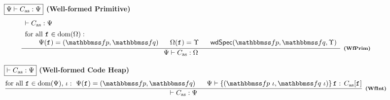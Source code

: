 \begin{figure*}[!t]
    \centering
    \subfigure
    {
        \begin{minipage}{1\linewidth}
            $\boxed{{\Psi} \vdash {C_{\text{as}}} : {\Psi}}$ \quad\quad
            \textbf{(Well-formed Primitive)}
            \[
				\infer[\tinybftext{(WfPrim)}]
				{
					\wfprim{\Cspec}{\asmimp}{\hprimset}
				}
				{
                    \begin{array}{l}
                        \wfcdhp{\asmimp}{\Cspec} \\
                        \\[-8pt]
                        \TYPE{for all } \lab{} \in \dom(\hprimset): \\
                        \qquad
                        \Cspec(\lab{}) = (\relspecpre, \relspecpost)
                        \quad \ \
                        \hprimset(\lab{}) = \hprim \quad \ \
                        \wdSpec{\relspecpre}{\relspecpost}
                        	{\hprim}
                    \end{array}
				}
			\]
		\end{minipage}
    }

    \subfigure
    {
        \begin{minipage}{1\textwidth}
            $\boxed{\vdash {C_{\text{as}}} : {\Psi}}$ \qquad
            \textbf{(Well-formed Code Heap)}
            \[
                \infer[\tinybftext{(WfInt)}]
                {
                    \wfcdhp{\asmimp}{\Cspec}
                }
                {
                    \TYPE{for all } \lab{} \in \dom(\Cspec), \,
                    \lgvl : \
                    \Cspec(\lab{}) = (\relspecpre, \relspecpost)
                    \quad \ \
                    \wdcblk{\Cspec}{\relspecpre \ \lgvl}
                        {\relspecpost \ \lgvl}{\lab{}}
                        {\asmimp[\lab{}]}
                }
            \]
        \end{minipage}
    }


\end{figure*}
